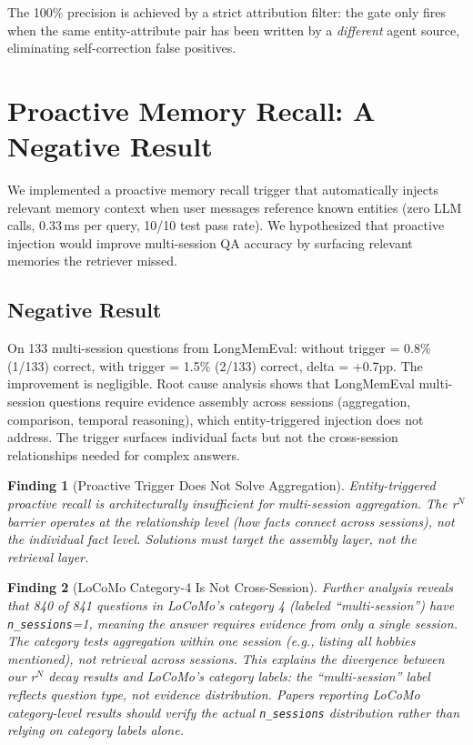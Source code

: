 \documentclass{article}
\newtheorem{finding}{Finding}
\begin{document}
The 100\% precision is achieved by a strict attribution filter: the gate only fires when the same entity-attribute pair has been written by a \emph{different} agent source, eliminating self-correction false positives.

\section{Proactive Memory Recall: A Negative Result}
\label{sec:trigger}

We implemented a proactive memory recall trigger that automatically injects relevant memory context when user messages reference known entities (zero LLM calls, 0.33\,ms per query, 10/10 test pass rate). We hypothesized that proactive injection would improve multi-session QA accuracy by surfacing relevant memories the retriever missed.

\subsection{Negative Result}

On 133 multi-session questions from LongMemEval: without trigger = 0.8\% (1/133) correct, with trigger = 1.5\% (2/133) correct, delta = +0.7pp. The improvement is negligible. Root cause analysis shows that LongMemEval multi-session questions require evidence assembly across sessions (aggregation, comparison, temporal reasoning), which entity-triggered injection does not address. The trigger surfaces individual facts but not the cross-session relationships needed for complex answers.

\begin{finding}[Proactive Trigger Does Not Solve Aggregation]
Entity-triggered proactive recall is architecturally insufficient for multi-session aggregation. The r$^N$ barrier operates at the \emph{relationship} level (how facts connect across sessions), not the \emph{individual fact} level. Solutions must target the assembly layer, not the retrieval layer.
\end{finding}

\begin{finding}[LoCoMo Category-4 Is Not Cross-Session]
\label{finding:cat4}
Further analysis reveals that 840 of 841 questions in LoCoMo's category 4 (labeled ``multi-session'') have \texttt{n\_sessions}=1, meaning the answer requires evidence from only a single session. The category tests aggregation \emph{within} one session (e.g., listing all hobbies mentioned), not retrieval \emph{across} sessions. This explains the divergence between our r$^N$ decay results and LoCoMo's category labels: the ``multi-session'' label reflects question type, not evidence distribution. Papers reporting LoCoMo category-level results should verify the actual \texttt{n\_sessions} distribution rather than relying on category labels alone.
\end{finding}
\end{document}
